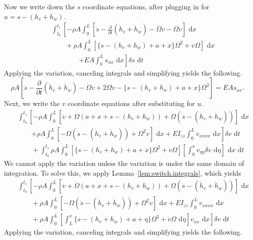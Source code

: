 Now we write down the $s$ coordinate equations, after plugging in for $u = s-(h_v+h_w)$.
\begin{eqnarray}
& & \int_{t_0}^{t_1}\left[-\rho A\int_0^L  \left[\ddot s-\frac{\partial}{\partial t}(\dot h_v+\dot h_w)-\dot \Omega v-\Omega \dot v\right]\text{ d}x\right. \nonumber \\
& & \qquad +\rho A\int_0^L  [\lbrace s-(h_v+h_w)+a+x\rbrace\Omega^2+\dot v\Omega]\text{ d}x \\
& & \qquad \qquad \left.+EA\int_0^L s_{xx}\text{ d}x \right]\delta s\text{ d}t\nonumber
\end{eqnarray}
Applying the variation, canceling integrals and simplifying yields the following.
\begin{equation}
\rho A \left[\ddot s-\frac{\partial}{\partial t}(\dot h_v+\dot h_w)-\dot \Omega v+2\Omega\dot v-\lbrace s-(h_v+h_w)+a+x\rbrace\Omega^2\right] = EAs_{xx}.
\end{equation}
Next, we write the $v$ coordinate equations after substituting for $u$.
\begin{eqnarray}
& & \int_{t_0}^{t_1}\left[-\rho A \int_0^L [\ddot v + \dot \Omega (a+x+s-(h_v+h_w))+\Omega(\dot s - (\dot h_v+\dot h_w))]\text{ d}x\right.\nonumber \\ 
& & \qquad\left. +\rho A\int_0^L  [-\Omega(\dot s-(\dot h_v+\dot h_w))+\Omega^2v] \text{ d}x + EI_{zz}\int_0^L v_{xxxx}\text{ d}x\right]\delta v\text{ d}t\\
& & \qquad +\int_{t_0}^{t_1}\rho A\int_0^L [\lbrace s-(h_v+h_w)+a+x\rbrace\Omega^2+\dot v\Omega]\left[\int_0^xv_{\eta\eta}\delta v\text{ d}\eta\right]\text{ d}x\text{ d}t\nonumber
\end{eqnarray}
We cannot apply the variation unless the variation is under the same domain of integration. To solve this, we apply Lemma~\ref{lem:switch.integrals}, which yields
\begin{eqnarray}
& & \int_{t_0}^{t_1}\left[-\rho A \int_0^L [\ddot v + \dot \Omega (a+x+s-(h_v+h_w))+\Omega(\dot s - (\dot h_v+\dot h_w))]\text{ d}x\right.\nonumber \\ 
& & \qquad +\rho A\int_0^L  [-\Omega(\dot s-(\dot h_v+\dot h_w))+\Omega^2v] \text{ d}x + EI_{zz}\int_0^L v_{xxxx}\text{ d}x\\
& & \qquad +\left.\rho A\int_0^L \left[\int_L^x\lbrace s-(h_v+h_w)+a+\eta\rbrace\Omega^2+\dot v\Omega\text{ d}\eta\right] v_{xx}\text{ d}x\right]\delta v\text{ d}t\nonumber
\end{eqnarray}
Applying the variation, canceling integrals and simplifying yields the following.

